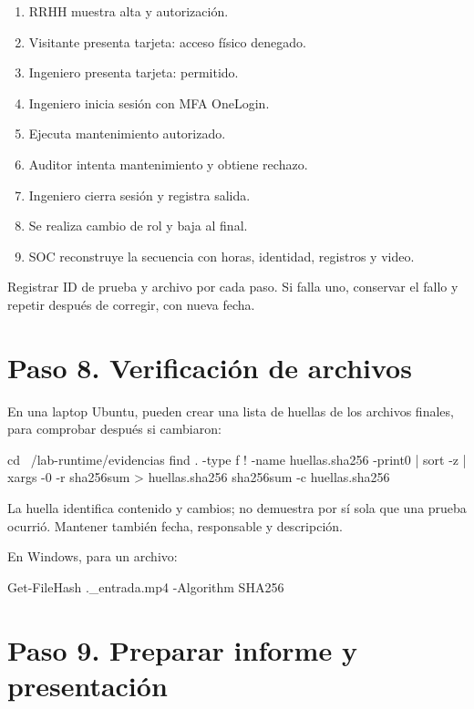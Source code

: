 \documentclass[12pt,a4paper]{article}
\begin{document}
\begin{enumerate}
\item RRHH muestra alta y autorización.
\item Visitante presenta tarjeta: acceso físico denegado.
\item Ingeniero presenta tarjeta: permitido.
\item Ingeniero inicia sesión con MFA OneLogin.
\item Ejecuta mantenimiento autorizado.
\item Auditor intenta mantenimiento y obtiene rechazo.
\item Ingeniero cierra sesión y registra salida.
\item Se realiza cambio de rol y baja al final.
\item SOC reconstruye la secuencia con horas, identidad, registros y video.
\end{enumerate}
Registrar ID de prueba y archivo por cada paso. Si falla uno, conservar el fallo y repetir después de corregir, con nueva fecha.\par
{}\section*{Paso 8. Verificación de archivos}
En una laptop Ubuntu, pueden crear una lista de huellas de los archivos finales, para comprobar después si cambiaron:\par
{}
\begin{Comandos}
cd ~/lab-runtime/evidencias
find . -type f ! -name huellas.sha256 -print0 | sort -z | xargs -0 -r sha256sum > huellas.sha256
sha256sum -c huellas.sha256
\end{Comandos}
La huella identifica contenido y cambios; no demuestra por sí sola que una prueba ocurrió. Mantener también fecha, responsable y descripción.\par
En Windows, para un archivo:\par
{}
\begin{Comandos}
Get-FileHash .\video_entrada.mp4 -Algorithm SHA256
\end{Comandos}
\section*{Paso 9. Preparar informe y presentación}
\end{document}
